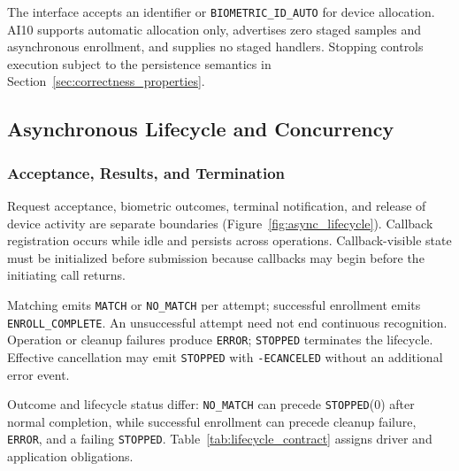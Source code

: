 The interface accepts an identifier or \texttt{BIOMETRIC\_\allowbreak{}ID\_\allowbreak{}AUTO} for device allocation. AI10 supports automatic allocation only, advertises zero staged samples and asynchronous enrollment, and supplies no staged handlers. Stopping controls execution subject to the persistence semantics in Section~\ref{sec:correctness_properties}.

\subsection{Asynchronous Lifecycle and Concurrency}
\label{sec:interrupt_io}

\subsubsection{Acceptance, Results, and Termination}

Request acceptance, biometric outcomes, terminal notification, and release of device activity are separate boundaries (Figure~\ref{fig:async_lifecycle}). Callback registration occurs while idle and persists across operations. Callback-visible state must be initialized before submission because callbacks may begin before the initiating call returns.

Matching emits \texttt{MATCH} or \texttt{NO\_\allowbreak{}MATCH} per attempt; successful enrollment emits \texttt{ENROLL\_\allowbreak{}COMPLETE}. An unsuccessful attempt need not end continuous recognition. Operation or cleanup failures produce \texttt{ERROR}; \texttt{STOPPED} terminates the lifecycle. Effective cancellation may emit \texttt{STOPPED} with \texttt{-ECANCELED} without an additional error event.

Outcome and lifecycle status differ: \texttt{NO\_\allowbreak{}MATCH} can precede \texttt{STOPPED}(0) after normal completion, while successful enrollment can precede cleanup failure, \texttt{ERROR}, and a failing \texttt{STOPPED}. Table~\ref{tab:lifecycle_contract} assigns driver and application obligations.


